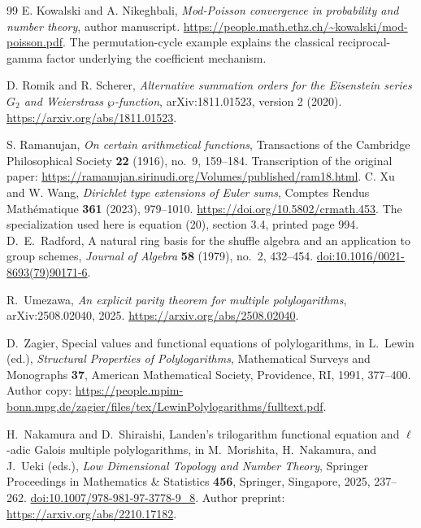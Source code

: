 \begin{thebibliography}{99}
E. Kowalski and A. Nikeghbali,
\emph{Mod-Poisson convergence in probability and number theory},
author manuscript.
\url{https://people.math.ethz.ch/~kowalski/mod-poisson.pdf}.
The permutation-cycle example explains the classical reciprocal-gamma
factor underlying the coefficient mechanism.

D. Romik and R. Scherer,
\emph{Alternative summation orders for the Eisenstein series \(G_2\)
and Weierstrass \(\wp\)-function},
arXiv:1811.01523, version 2 (2020).
\url{https://arxiv.org/abs/1811.01523}.

S. Ramanujan, \emph{On certain arithmetical functions},
Transactions of the Cambridge Philosophical Society
\textbf{22} (1916), no.~9, 159--184.
Transcription of the original paper:
\url{https://ramanujan.sirinudi.org/Volumes/published/ram18.html}.
C. Xu and W. Wang, \emph{Dirichlet type extensions of Euler sums},
Comptes Rendus Math\'ematique \textbf{361} (2023), 979--1010.
\url{https://doi.org/10.5802/crmath.453}.
The specialization used here is equation (20), section 3.4,
printed page 994.
D.~E.~Radford, A natural ring basis for the shuffle algebra and an
application to group schemes, \emph{Journal of Algebra} \textbf{58}
(1979), no.~2, 432--454.
\href{https://doi.org/10.1016/0021-8693(79)90171-6}{doi:10.1016/0021-8693(79)90171-6}.

R.~Umezawa, \emph{An explicit parity theorem for multiple polylogarithms},
arXiv:2508.02040, 2025.
\url{https://arxiv.org/abs/2508.02040}.

D.~Zagier, Special values and functional equations of polylogarithms,
in L.~Lewin (ed.), \emph{Structural Properties of Polylogarithms},
Mathematical Surveys and Monographs \textbf{37}, American Mathematical
Society, Providence, RI, 1991, 377--400.
Author copy:
\url{https://people.mpim-bonn.mpg.de/zagier/files/tex/LewinPolylogarithms/fulltext.pdf}.

H.~Nakamura and D.~Shiraishi, Landen's trilogarithm functional equation
and \(\ell\)-adic Galois multiple polylogarithms,
in M.~Morishita, H.~Nakamura, and J.~Ueki (eds.),
\emph{Low Dimensional Topology and Number Theory},
Springer Proceedings in Mathematics \& Statistics \textbf{456},
Springer, Singapore, 2025, 237--262.
\href{https://doi.org/10.1007/978-981-97-3778-9_8}{doi:10.1007/978-981-97-3778-9\_8}.
Author preprint: \url{https://arxiv.org/abs/2210.17182}.


\end{thebibliography}
